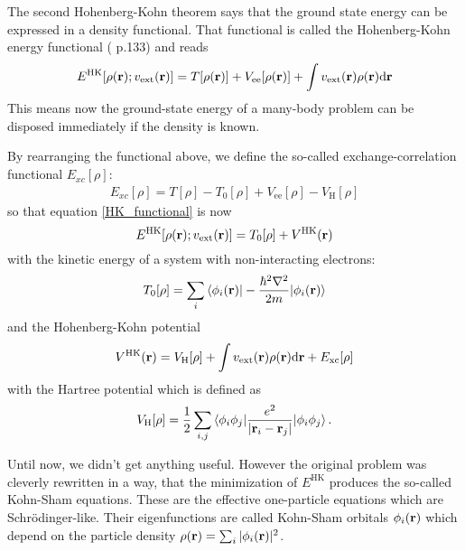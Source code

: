 	The second Hohenberg-Kohn theorem says that the ground state energy can be expressed in a density functional. That functional is called the Hohenberg-Kohn energy functional (\cite{solid_state_book} p.133) and reads
	\begin{equation} \label{HK_functional}
		E^{\text{HK}}[\rho(\textbf{r});v_{\text{ext}}(\textbf{r})] = 
		T[\rho(\textbf{r})] + V_{\text{ee}}[\rho(\textbf{r})] + \int v_{\text{ext}}(\textbf{r}) \rho(\textbf{r}) \mathrm{d} \textbf{r} 
	\end{equation}
	This means now the ground-state energy of a many-body problem can be disposed immediately if the density is known. 

	By rearranging the functional above, we define the so-called exchange-correlation functional $E_{xc}[\rho]$:
	\begin{align}
	E_{xc}[\rho] = T[\rho] - T_0 [\rho] + V_{\text{ee}} [\rho] - V_\text{H} [\rho]
	\end{align}
	so that equation \eqref{HK_functional} is now
	\begin{equation}
	E^{\text{HK}}[\rho(\textbf{r}); v_{\text{ext}}(\textbf{r})] = 
	T_0 [\rho] + V^\text{HK}(\textbf{r})
	\end{equation}
	with the kinetic energy of a system with non-interacting electrons:
	\begin{equation}
		T_0 [\rho] = \sum_i \braket{\phi_i(\textbf{r})| -\frac{\hbar^2 \nabla^2}{2m} | \phi_i(\textbf{r})}
	\end{equation}  
	and the Hohenberg-Kohn potential
	\begin{equation}
		V^\text{HK}(\textbf{r})= V_\text{H} [\rho] + \int v_{\text{ext}}(\textbf{r}) \rho(\textbf{r}) \mathrm{d} \textbf{r} + E_{\text{xc}} [\rho]
	\end{equation}
	with the Hartree potential which is defined as
	\begin{equation}
		V_\text{H}[\rho]= \frac{1}{2} \sum_{i,j} \braket{\phi_i \phi_j| \frac{e^2}{|\textbf{r}_i-\textbf{r}_j|} |\phi_i \phi_j}.
	\end{equation}
	
	Until now, we didn't get anything useful. However the original problem was cleverly rewritten in a way, that the minimization of $E^\text{HK}$ produces the so-called Kohn-Sham equations. These are the effective one-particle equations which are Schrödinger-like. Their eigenfunctions are called Kohn-Sham orbitals $\phi_i(\textbf{r})$ which depend on the particle density $\rho(\textbf{r}) = \sum_i |\phi_i(\textbf{r})|^2$.

